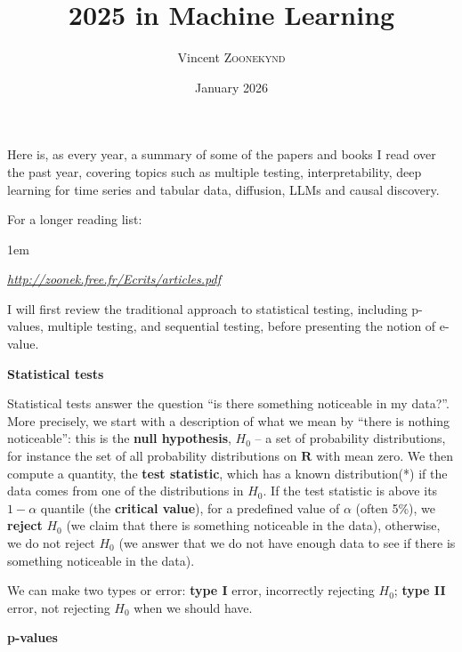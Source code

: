 \documentclass[a5paper]{article}
\title{2025 in Machine Learning}
\author{Vincent \textsc{Zoonekynd}}
\date{January 2026}
\def\RR{\mathbf{R}}
\let\d\textbf
\newenvironment{reference}{%
  \medskip\goodbreak
  \parskip 0pt
  \raggedright
  \leftskip 1em
  \obeylines
}{\par\medskip\goodbreak}
\def\section#1{\clearpage{\vspace*{0cm}\LARGE\centering\bfseries #1\par\bigskip\bigskip}}
\def\subsection#1{{\par\bigskip\goodbreak\large\bfseries #1\par}}
\begin{document}
\maketitle
\thispagestyle{empty}
\clearpage
\sloppy


Here is, as every year, a summary of some of the papers and books I read over the past year,
covering topics such as multiple testing, interpretability,
deep learning for time series and tabular data,
diffusion, LLMs and causal discovery.

For a longer reading list:

\begin{reference}
  \emph{\emph{\url{http://zoonek.free.fr/Ecrits/articles.pdf}}}
\end{reference}

\section{Multiple Testing}

I will first review the traditional approach to statistical testing,
including p-values, multiple testing, and sequential testing,
before presenting the notion of e-value.

\subsection{Statistical tests}

Statistical tests answer the question ``is there something noticeable in my data?''.
More precisely, we start with a description of what we mean by ``there is nothing noticeable'':
this is the \d{null hypothesis}, $H_0$ -- a set of probability distributions,
for instance the set of all probability distributions on $\RR$ with mean zero.
We then compute a quantity, the \d{test statistic},
which has a known distribution(*)
if the data comes from one of the distributions in $H_0$.
If the test statistic is above its $1-\alpha$ quantile (the \d{critical value}),
for a predefined value of $\alpha$ (often 5\%),
we \d{reject} $H_0$ (we claim that there is something noticeable in the data),
otherwise, we do not reject $H_0$
(we answer that we do not have enough data to see if there is something noticeable in the data).

We can make two types or error:
\d{type I} error, incorrectly rejecting $H_0$;
\d{type II} error, not rejecting $H_0$ when we should have.

\subsection{p-values}
\end{document}

